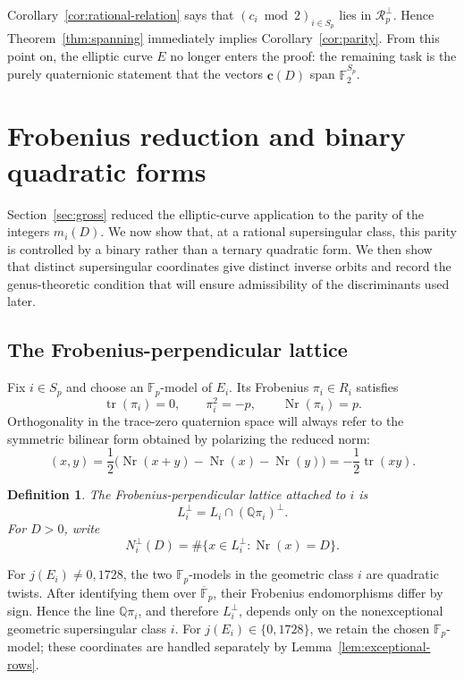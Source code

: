 \documentclass[10pt,a4paper]{amsart}
\newtheorem*{definition*}{Definition}
\newcommand{\Q}{\mathbb{Q}}
\newcommand{\F}{\mathbb{F}}
\newcommand{\tr}{\operatorname{tr}}
\newcommand{\Nr}{\operatorname{Nr}}
\newcommand{\crow}{\mathbf{c}}
\newcommand{\Rp}{\mathcal{R}_p}
\begin{document}
Corollary~\ref{cor:rational-relation} says that $(c_i\bmod2)_{i\in S_p}$ lies in $\Rp^\perp$.  Hence Theorem~\ref{thm:spanning} immediately implies Corollary~\ref{cor:parity}.  From this point on, the elliptic curve $E$ no longer enters the proof: the remaining task is the purely quaternionic statement that the vectors $\crow(D)$ span $\F_2^{S_p}$.

\section{Frobenius reduction and binary quadratic forms}\label{sec:binary}

Section~\ref{sec:gross} reduced the elliptic-curve application to the
parity of the integers $m_i(D)$. We now show that, at a rational
supersingular class, this parity is controlled by a binary rather than a
ternary quadratic form. We then show that distinct supersingular
coordinates give distinct inverse orbits and record the
genus-theoretic condition that will ensure admissibility of the
discriminants used later.

\subsection{The Frobenius-perpendicular lattice}

Fix $i\in S_p$ and choose an $\F_p$-model of $E_i$.  Its Frobenius $\pi_i\in R_i$ satisfies
\[
  \tr(\pi_i)=0,
  \qquad \pi_i^2=-p,
  \qquad \Nr(\pi_i)=p.
\]
Orthogonality in the trace-zero quaternion space will always refer to the
symmetric bilinear form obtained by polarizing the reduced norm:
\[
  (x,y)=\frac12\bigl(\Nr(x+y)-\Nr(x)-\Nr(y)\bigr)
       =-\frac12\tr(xy).
\]

\begin{definition*}
The \emph{Frobenius-perpendicular lattice} attached to $i$ is
\[
  L_i^\perp=L_i\cap(\Q\pi_i)^\perp.
\]
For $D>0$, write
\[
  N_i^\perp(D)=\#\{x\in L_i^\perp:\Nr(x)=D\}.
\]
\end{definition*}


For $j(E_i)\ne0,1728$, the two $\F_p$-models in the geometric class
$i$ are quadratic twists. After identifying them over
$\overline{\F}_p$, their Frobenius endomorphisms differ by sign. Hence
the line $\Q\pi_i$, and therefore $L_i^\perp$, depends only on the
nonexceptional geometric supersingular class $i$. For $j(E_i) \in \{0,1728\}$, we
retain the chosen $\F_p$-model; these coordinates are handled separately
by Lemma~\ref{lem:exceptional-rows}.
\end{document}
